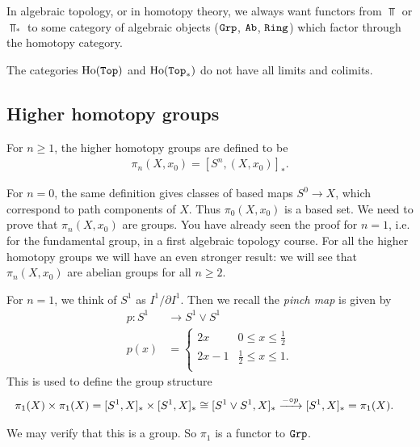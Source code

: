 \documentclass{article}[11pt]
\begin{document}
In algebraic topology, or in homotopy theory, we always want functors from $\Top$ or $\Top_\ast$ to some category of algebraic objects ($\texttt{Grp}$, $\texttt{Ab}$, $\texttt{Ring}$) which factor through the homotopy category.

\begin{warn} The categories $\text{Ho}(\texttt{Top})$ and $\text{Ho}(\texttt{Top}_\ast)$ do not have all limits and colimits.
\end{warn}


\subsection{Higher homotopy groups}

\begin{definition} For $n\geq 1$, the higher homotopy groups are defined to be
\begin{align*}
	\pi_n(X,x_0) = [S^n, (X,x_0)]_{\ast}.
\end{align*}
\end{definition}

For $n=0$, the same definition gives classes of based maps $S^0 \to X$, which correspond to path components of $X$. Thus $\pi_0(X, x_0)$ is a based set. We need to prove that $\pi_n(X, x_0)$ are groups. You have already seen the proof for $n=1$, i.e. for the fundamental group, in a first algebraic topology course. For all the higher homotopy groups we will have an even stronger result: we will see that $\pi_n(X, x_0)$ are abelian groups for all $n\geq 2$.


For $n=1$, we think of $S^1$ as $I^1 \Big/ \partial I^1$. Then we recall the \textit{pinch map} is given by
	\begin{align*}
		p : S^1 &\to S^1 \vee S^1 \\
		p(x) &= \begin{cases} 2x & 0\leq x \leq \frac{1}{2} \\ 2x-1 & \frac{1}{2} \leq x \leq 1. \\ \end{cases}
	\end{align*}
	This is used to define the group structure
	\begin{align*}
		\pi_1(X)\times \pi_1(X) &= [S^1,X]_\ast \times [S^1,X]_\ast \cong [S^1 \vee S^1, X]_\ast \xrightarrow{-\circ p} [S^1, X]_\ast = \pi_1(X).
	\end{align*}

We may verify that this is a group. So $\pi_1$ is a functor to $\texttt{Grp}$.
\end{document}
